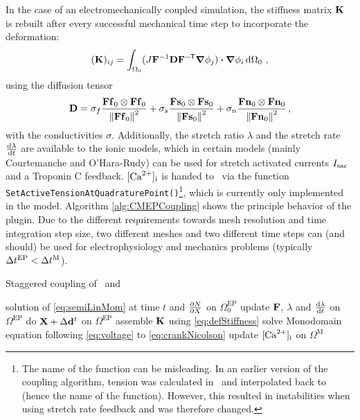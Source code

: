 In the case of an electromechanically coupled simulation, the stiffness matrix $\K$ is rebuilt after every successful mechanical time step to incorporate the deformation:
\begin{equation}
    (\vec K)_{ij} = \int_{\Omega_0} (J \F^{-1} \D \F^{-\tran} \grad{\phi_j}) \dotproduct \grad{\phi_i} \dd{\Omega_0} \,, \label{eq:defStiffness}
\end{equation}
using the diffusion tensor
\begin{equation}
    \vec D = \sigma_{f} \frac{\vec F \vec f_0 \otimes \vec F \vec f_0}{\norm{\vec F \vec f_0}^2} + \sigma_{ s} \frac{\vec F \vec s_0 \otimes \vec F \vec s_0}{\norm{\vec F \vec s_0}^2} + \sigma_{ n} \frac{\vec F \vec n_0 \otimes \vec F \vec n_0}{\norm{\vec F \vec n_0}^2} \,, 
\end{equation}
with the conductivities $\sigma$.
Additionally, the stretch ratio $\lambda$ and the stretch rate $\dv{\lambda}{t}$ are available to the ionic models, which in certain models (mainly Courtemanche and O'Hara-Rudy) can be used for stretch activated currents $I_{\mathrm{sac}}$ and a Troponin C feedback.
$[\mathrm{Ca}^{2+}]_{\mathrm{i}}$ is handed to \CM~via the function \verb|SetActiveTensionAtQuadraturePoint()|\footnote{The name of the function can be misleading. In an earlier version of the coupling algorithm, tension was calculated in \ACC~and interpolated back to \CM (hence the name of the function). However, this resulted in instabilities when using stretch rate feedback and was therefore changed.}, which is currently only implemented in the  model.
Algorithm \autoref{alg:CMEPCoupling} shows the principle behavior of the plugin.
Due to the different requirements towards mesh resolution and time integration step size, two different meshes and two different time steps can (and should) be used for electrophysiology and mechanics problems (typically $\Delta t^\mathrm{EP} < \Delta t^\mathrm{M}$).

\begin{algorithm}
\caption{Staggered coupling of \CM~and \ACC}\label{alg:CMEPCoupling}
\begin{algorithmic}[1]
\Require solution of \eqref{eq:semiLinMom} at time $t$ and $\pdv{N}{X}$ on $\Omega^\mathrm{EP}_0$
\Repeat
\State update $\F$, $\lambda$ and $\dv{\lambda}{t}$ on $\Omega^\mathrm{EP}$
\State do $\vec X + \Delta \dn{t}$ on $\Omega^\mathrm{EP}$
\State assemble $\K$ using \eqref{eq:defStiffness}
\State solve Monodomain equation following \eqref{eq:voltage} to \eqref{eq:crankNicolson}
\State update $[\mathrm{Ca}^{2+}]_{\mathrm{i}}$ on $\Omega^\mathrm{M}$
\end{algorithmic}
\end{algorithm}

